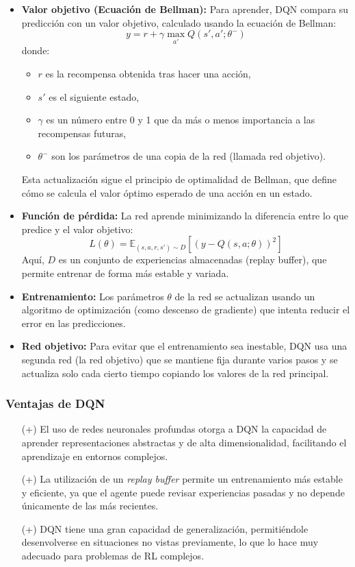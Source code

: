 \begin{itemize}
    \item \textbf{Valor objetivo (Ecuación de Bellman):} Para aprender, DQN compara su predicción 
    con un valor objetivo, calculado usando la ecuación de Bellman:
        \[
        y = r + \gamma \max_{a'} Q(s', a'; \theta^-)
        \]
     donde:
    \begin{itemize}
        \item \( r \) es la recompensa obtenida tras hacer una acción,
        \item \( s' \) es el siguiente estado,
        \item \( \gamma \) es un número entre 0 y 1 que da más o menos importancia a las recompensas 
        futuras,
        \item \( \theta^- \) son los parámetros de una copia de la red (llamada red objetivo).
    \end{itemize}
    Esta actualización sigue el principio de optimalidad de Bellman, que define cómo se calcula el valor óptimo esperado de una acción en un estado.

    \item \textbf{Función de pérdida:} La red aprende minimizando la diferencia entre lo que predice 
    y el valor objetivo:
    \[
    L(\theta) = \mathbb{E}_{(s, a, r, s') \sim D} \left[ \left( y - Q(s, a; \theta) \right)^2 \right]
    \]
    Aquí, \( D \) es un conjunto de experiencias almacenadas (replay buffer), que permite entrenar de 
    forma más estable y variada.

    \item \textbf{Entrenamiento:} Los parámetros \( \theta \) de la red se actualizan usando un 
    algoritmo de optimización (como descenso de gradiente) que intenta reducir el error en las 
    predicciones.

    \item \textbf{Red objetivo:} Para evitar que el entrenamiento sea inestable, DQN usa una segunda 
    red (la red objetivo) que se mantiene fija durante varios pasos y se actualiza solo cada cierto 
    tiempo copiando los valores de la red principal.
\end{itemize}

\subsubsection{Ventajas de DQN \cite{dhumne2019dqn}}
\begin{itemize}
    \item[(+)] El uso de redes neuronales profundas otorga a DQN la capacidad de aprender 
    representaciones abstractas y de alta dimensionalidad, facilitando el aprendizaje en entornos 
    complejos.
    \item[(+)] La utilización de un \textit{replay buffer} permite un entrenamiento más estable y 
    eficiente, ya que el agente puede revisar experiencias pasadas y no depende únicamente de las 
    más recientes.
    \item[(+)] DQN tiene una gran capacidad de generalización, permitiéndole desenvolverse en 
    situaciones no vistas previamente, lo que lo hace muy adecuado para problemas de RL complejos.
\end{itemize}

